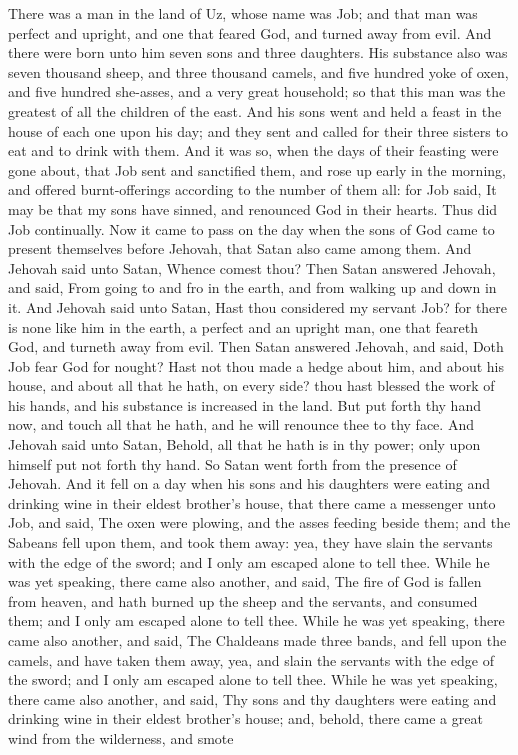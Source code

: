 


There was a man in the land of Uz, whose name was Job; and that man was perfect and upright, and one that feared God, and turned away from evil. And there were born unto him seven sons and three daughters. His substance also was seven thousand sheep, and three thousand camels, and five hundred yoke of oxen, and five hundred she-asses, and a very great household; so that this man was the greatest of all the children of the east. And his sons went and held a feast in the house of each one upon his day; and they sent and called for their three sisters to eat and to drink with them. And it was so, when the days of their feasting were gone about, that Job sent and sanctified them, and rose up early in the morning, and offered burnt-offerings according to the number of them all: for Job said, It may be that my sons have sinned, and renounced God in their hearts. Thus did Job continually.  Now it came to pass on the day when the sons of God came to present themselves before Jehovah, that Satan also came among them. And Jehovah said unto Satan, Whence comest thou? Then Satan answered Jehovah, and said, From going to and fro in the earth, and from walking up and down in it. And Jehovah said unto Satan, Hast thou considered my servant Job? for there is none like him in the earth, a perfect and an upright man, one that feareth God, and turneth away from evil. Then Satan answered Jehovah, and said, Doth Job fear God for nought? Hast not thou made a hedge about him, and about his house, and about all that he hath, on every side? thou hast blessed the work of his hands, and his substance is increased in the land. But put forth thy hand now, and touch all that he hath, and he will renounce thee to thy face. And Jehovah said unto Satan, Behold, all that he hath is in thy power; only upon himself put not forth thy hand. So Satan went forth from the presence of Jehovah.  And it fell on a day when his sons and his daughters were eating and drinking wine in their eldest brother’s house, that there came a messenger unto Job, and said, The oxen were plowing, and the asses feeding beside them; and the Sabeans fell upon them, and took them away: yea, they have slain the servants with the edge of the sword; and I only am escaped alone to tell thee. While he was yet speaking, there came also another, and said, The fire of God is fallen from heaven, and hath burned up the sheep and the servants, and consumed them; and I only am escaped alone to tell thee. While he was yet speaking, there came also another, and said, The Chaldeans made three bands, and fell upon the camels, and have taken them away, yea, and slain the servants with the edge of the sword; and I only am escaped alone to tell thee. While he was yet speaking, there came also another, and said, Thy sons and thy daughters were eating and drinking wine in their eldest brother’s house; and, behold, there came a great wind from the wilderness, and smote 